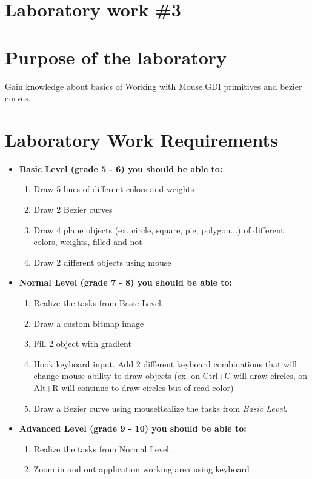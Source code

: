 \section*{Laboratory work \#3}

\section{Purpose of the laboratory}
Gain knowledge about basics of Working with Mouse,GDI primitives and bezier curves.
\section{Laboratory Work Requirements}
\begin{itemize}
\item \textbf{Basic Level (grade 5 - 6) you should be able to:}
	\begin{enumerate}
	\item Draw 5 lines of different colors and weights
\item	Draw 2 Bezier curves
	 \item Draw 4 plane objects (ex. circle, square, pie, polygon...) of different colors, weights, filled and not
\item	Draw 2 different objects using mouse
    \end{enumerate}
\item \textbf{Normal Level (grade 7 - 8) you should be able to:}
    \begin{enumerate}
    \item Realize the tasks from Basic Level.
  \item   Draw a custom bitmap image
   \item  Fill 2 object with gradient
   \item  Hook keyboard input. Add 2 different keyboard combinations that will change mouse ability to draw objects (ex. on Ctrl+C will draw circles, on Alt+R will continue to draw circles but of read color)
  \item   Draw a Bezier curve using mouseRealize the tasks from \textit{Basic Level}.
    \end{enumerate}
\item \textbf{Advanced Level (grade 9 - 10) you should be able to:}
    \begin{enumerate}
    \item Realize the tasks from Normal Level.
    \item  Zoom in and out application working area using keyboard

\end{enumerate}
\end{itemize}
